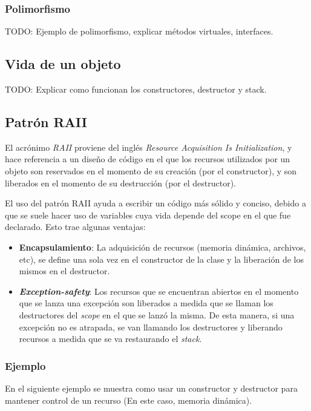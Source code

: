 \documentclass[a4paper, twoside]{article}
\newcommand{\codedir}{../resources/code} %
\begin{document}
\subsubsection{Polimorfismo}
TODO: Ejemplo de polimorfismo, explicar métodos virtuales, interfaces. %

\subsection{Vida de un objeto}
TODO: Explicar como funcionan los constructores, destructor y stack.

\subsection{Patrón RAII}
El acrónimo \emph{RAII} proviene del inglés \emph{Resource Acquisition Is Initialization}, y hace referencia a un diseño de código en el que los recursos utilizados por un objeto son reservados en el momento de su creación (por el constructor), y son liberados en el momento de su destrucción (por el destructor).

El uso del patrón RAII ayuda a escribir un código más sólido y conciso, debido a que se suele hacer uso de variables cuya vida depende del scope en el que fue declarado. Esto trae algunas ventajas:

\begin{itemize}
	\item \textbf{Encapsulamiento}: La adquisición de recursos (memoria dinámica, archivos, etc), se define una sola vez en el constructor de la clase y la liberación de los mismos en el destructor.
	\item \emph{\textbf{Exception-safety}}: Los recursos que se encuentran abiertos en el momento que se lanza una excepción son liberados a medida que se llaman los destructores del \emph{scope} en el que se lanzó la misma. De esta manera, si una excepción no es atrapada, se van llamando los destructores y liberando recursos a medida que se va restaurando el \emph{stack}.
\end{itemize}

\newpage
\subsubsection{Ejemplo}
En el siguiente ejemplo se muestra como usar un constructor y destructor para mantener control de un recurso (En este caso, memoria dinámica).


\end{document}
